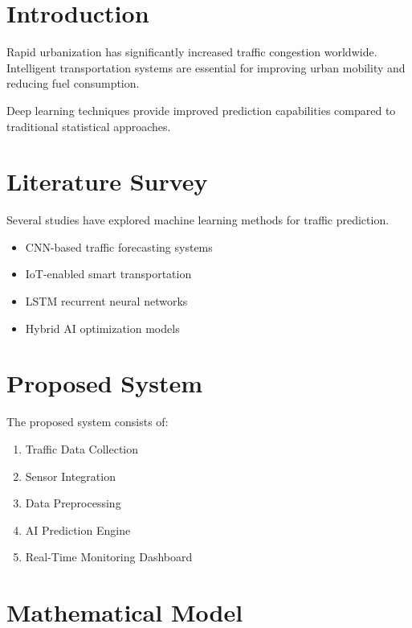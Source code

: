 \documentclass[12pt,a4paper]{article}
\begin{document}
	\section{Introduction}
	
	Rapid urbanization has significantly increased traffic congestion worldwide. Intelligent transportation systems are essential for improving urban mobility and reducing fuel consumption.
	
	Deep learning techniques provide improved prediction capabilities compared to traditional statistical approaches.
	
	
	\section{Literature Survey}
	
	Several studies have explored machine learning methods for traffic prediction.
	
	\begin{itemize}
		\item CNN-based traffic forecasting systems
		\item IoT-enabled smart transportation
		\item LSTM recurrent neural networks
		\item Hybrid AI optimization models
	\end{itemize}
	
	
	\section{Proposed System}
	
	The proposed system consists of:
	
	\begin{enumerate}
		\item Traffic Data Collection
		\item Sensor Integration
		\item Data Preprocessing
		\item AI Prediction Engine
		\item Real-Time Monitoring Dashboard
	\end{enumerate}
	
	
	\section{Mathematical Model}
	
\end{document}
